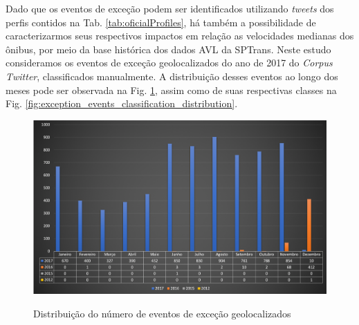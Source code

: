 \documentclass[
	12pt,				%
	oneside,			%
	a4paper,			%
	english,			%
	brazil				%
	]{abntex2ppgsi}
\begin{document}
{{Dado que os eventos de exceção podem ser identificados utilizando \textit{tweets} dos perfis contidos na Tab. \ref{tab:oficialProfiles}, há também a possibilidade de caracterizarmos seus respectivos impactos em relação as velocidades medianas dos ônibus, por meio da base histórica dos dados AVL da SPTrans.  Neste estudo consideramos os eventos de exceção geolocalizados do ano de 2017 do \textit{Corpus Twitter}, classificados manualmente. A distribuição desses eventos ao longo dos meses pode ser observada  na Fig. \ref{fig:geolocated_exception_events_distribution}, assim como de suas respectivas classes na Fig. \ref{fig:exception_events_classification_distribution}.



\begin{figure}[!htb]
	\centering
 	  \caption{Distribuição do número de eventos de exceção geolocalizados}
		\includegraphics[width=1\linewidth]{images/geolocated_exception_events_distribution_pt.png}
	\label{fig:geolocated_exception_events_distribution}
\end{figure}

}}
\end{document}
